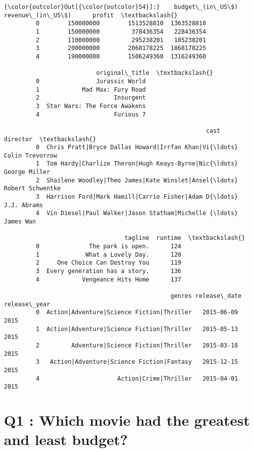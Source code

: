 \documentclass[11pt]{article}
\begin{document}
\begin{Verbatim}[commandchars=\\\{\}]
{\color{outcolor}Out[{\color{outcolor}54}]:}    budget\_(in\_US\$)  revenue\_(in\_US\$)      profit  \textbackslash{}
         0        150000000        1513528810  1363528810   
         1        150000000         378436354   228436354   
         2        110000000         295238201   185238201   
         3        200000000        2068178225  1868178225   
         4        190000000        1506249360  1316249360   
         
                          original\_title  \textbackslash{}
         0                Jurassic World   
         1            Mad Max: Fury Road   
         2                     Insurgent   
         3  Star Wars: The Force Awakens   
         4                     Furious 7   
         
                                                         cast          director  \textbackslash{}
         0  Chris Pratt|Bryce Dallas Howard|Irrfan Khan|Vi{\ldots}   Colin Trevorrow   
         1  Tom Hardy|Charlize Theron|Hugh Keays-Byrne|Nic{\ldots}     George Miller   
         2  Shailene Woodley|Theo James|Kate Winslet|Ansel{\ldots}  Robert Schwentke   
         3  Harrison Ford|Mark Hamill|Carrie Fisher|Adam D{\ldots}       J.J. Abrams   
         4  Vin Diesel|Paul Walker|Jason Statham|Michelle {\ldots}         James Wan   
         
                                  tagline  runtime  \textbackslash{}
         0              The park is open.      124   
         1             What a Lovely Day.      120   
         2     One Choice Can Destroy You      119   
         3  Every generation has a story.      136   
         4            Vengeance Hits Home      137   
         
                                               genres release\_date  release\_year  
         0  Action|Adventure|Science Fiction|Thriller   2015-06-09          2015  
         1  Action|Adventure|Science Fiction|Thriller   2015-05-13          2015  
         2         Adventure|Science Fiction|Thriller   2015-03-18          2015  
         3   Action|Adventure|Science Fiction|Fantasy   2015-12-15          2015  
         4                      Action|Crime|Thriller   2015-04-01          2015  
\end{Verbatim}
            
    \section{Q1 : Which movie had the greatest and least
budget?}\label{q1-which-movie-had-the-greatest-and-least-budget}
\end{document}
